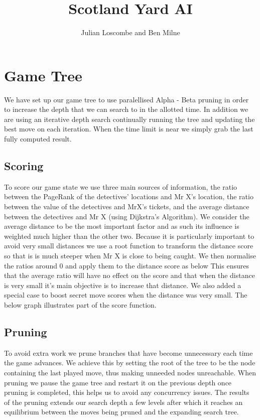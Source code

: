 \documentclass[a4paper, 12pt]{article}
\title{Scotland Yard AI}
\author{Julian Loscombe and Ben Milne}
\begin{document}
\maketitle
\section{Game Tree}
We have set up our game tree to use paralellised Alpha - Beta pruning in order to increase the depth that we can search to in the allotted time. In addition we are using an iterative depth search continually running the tree and updating the best move on each iteration. When the time limit is near we simply grab the last fully computed result.
\subsection{Scoring}
To score our game state we use three main sources of information, the ratio between the PageRank of the detectives' locations and Mr X's location, the ratio between the value of the detectives and MrX's tickets, and the average distance between the detectives and Mr X (using Dijkstra's Algorithm). We consider the average distance to be the most important factor and as such its influence is weighted much higher than the other two. Because it is particularly important to avoid very small distances we use a root function to transform the distance score so that is is much steeper when Mr X is close to being caught. We then normalise the ratios around 0 and apply them to the distance score as below
This ensures that the average ratio will have no effect on the score and that when the distance is very small it's main objective is to increase that distance. We also added a special case to boost secret move scores when the distance was very small. The below graph illustrates part of the score function.
\subsection{Pruning}
To avoid extra work we prune branches that have become unnecessary each time the game advances. We achieve this by setting the root of the tree to be the node containing the last played move, thus making unneeded nodes unreachable. When pruning we pause the game tree and restart it on the previous depth once pruning is completed, this helps us to avoid any concurrency issues. The results of the pruning extends our search depth a few levels after which it reaches an equilibrium between the moves being pruned and the expanding search tree.
\end{document}
